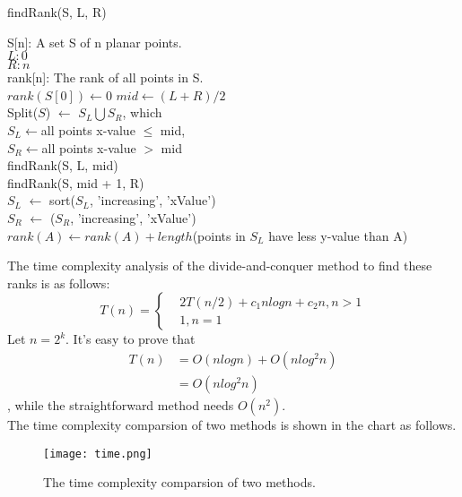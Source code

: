 \documentclass{article}
\begin{document}
	\begin{algorithm}
		\caption{findRank(S, L, R)}
	\begin{algorithmic}[1]
		\REQUIRE S[n]: A set S of n planar points.\\
				$L: 0$\\
				$R: n$\\
		\ENSURE rank[n]: The rank of all points in S.\\
		
		\RETURN $rank(S[0]) \gets 0$
		\ENDIF
		\STATE $mid \gets (L + R)/ 2$\\
		\STATE Split($S$) $\gets$ $S_L \bigcup S_R$, which\\
			$S_L \gets $all points x-value $\leq$ mid,\\
			$S_R \gets $all points x-value $>$ mid\\			
		\STATE findRank(S, L, mid)\\
		\STATE findRank(S, mid + 1, R)\\
		
		\STATE $S_L$ $\gets$ sort($S_L$, 'increasing', 'xValue')\\
		\STATE $S_R$ $\gets$ ($S_R$, 'increasing', 'xValue')\\ 
			\STATE $rank(A) \gets rank(A) + length$(points in $S_L$ have less y-value than A)\\
		\ENDFOR
	\end{algorithmic}
	\end{algorithm}

	The time complexity analysis of the divide-and-conquer method to find these ranks is as follows:\\


	$$ T(n)=\left\{	
	\begin{aligned}
		&2T(n/2) + c_{1}nlogn + c_{2}n, n > 1\\
		&1, n = 1
	\end{aligned}
	\right.
	$$
	Let $n = 2^k$. It's easy to prove that\\
	\begin{align*}
	T(n) &= O(n log n) + O(n log^{2} n)\\
		&= O(n log^{2} n)
	\end{align*}	
	, while the straightforward method needs $O(n^2)$.\\
	The time complexity comparsion of two methods is shown in the chart as follows.\\
	\begin{figure}
	\centering
	\caption{The time complexity comparsion of two methods.}
	\texttt{[image: time.png]}
	\end{figure}
\end{document}
